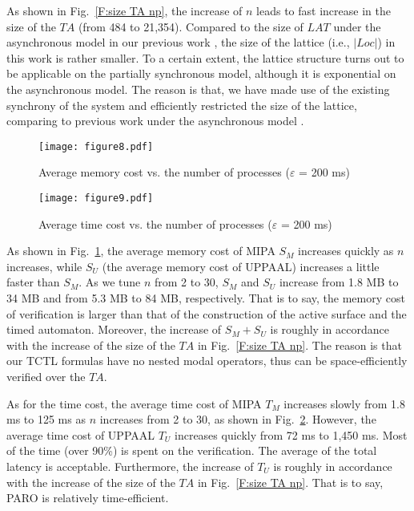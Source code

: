 \documentclass[10pt,conference,compsocconf,letterpaper]{IEEEtran}
\begin{document}
As shown in Fig.~\ref{F:size TA np}, the increase of $n$ leads to fast increase in the size of the $TA$ (from 484 to 21,354). Compared to the size of $LAT$ under the asynchronous model in our previous work \cite{Yang13}, the size of the lattice (i.e., $|Loc|$) in this work is rather smaller. To a certain extent, the lattice structure turns out to be applicable on the partially synchronous model, although it is exponential on the asynchronous model. The reason is that, we have made use of the existing synchrony of the system and efficiently restricted the size of the lattice, comparing to previous work under the asynchronous model \cite{Schwarz94, Yang13}.
\begin{figure}[tbp]
\begin{center}
  \texttt{[image: figure8.pdf]}
  \caption{Average memory cost vs. the number of processes ($\varepsilon$ = 200 ms)}
  \label{F:memory vs np}
\end{center}
\end{figure}
\begin{figure}[t]
\begin{center}
  \texttt{[image: figure9.pdf]}
  \caption{Average time cost vs. the number of processes ($\varepsilon$ = 200 ms)}
  \label{F:time vs np}
\end{center}
\end{figure}

As shown in Fig.~\ref{F:memory vs np}, the average memory cost of MIPA $S_M$ increases quickly as $n$ increases, while $S_U$ (the average memory cost of UPPAAL) increases a little faster than $S_M$. As we tune $n$ from 2 to 30, $S_M$ and $S_U$ increase from 1.8 MB to 34 MB and from 5.3 MB to 84 MB, respectively. That is to say, the memory cost of verification is larger than that of the construction of the active surface and the timed automaton. Moreover, the increase of $S_M + S_U$ is roughly in accordance with the increase of the size of the $TA$ in Fig.~\ref{F:size TA np}. The reason is that our TCTL formulas have no nested modal operators, thus can be space-efficiently verified over the $TA$.

As for the time cost, the average time cost of MIPA $T_M$ increases slowly from 1.8 ms to 125 ms as $n$ increases from 2 to 30, as shown in Fig.~\ref{F:time vs np}. However, the average time cost of UPPAAL $T_U$ increases quickly from 72 ms to 1,450 ms. Most of the time (over 90\%) is spent on the verification. The average of the total latency is acceptable. Furthermore, the increase of $T_U$ is roughly in accordance with the increase of the size of the $TA$ in Fig.~\ref{F:size TA np}. That is to say, \textsf{PARO} is relatively time-efficient.
\end{document}
